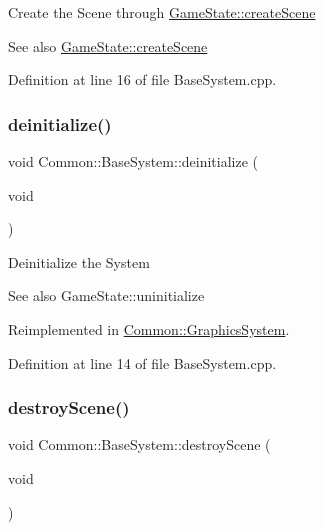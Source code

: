 Create the Scene through \hyperlink{class_common_1_1_game_state_a30b77d03dd849ebb2d6698686e9e7619}{Game\+State\+::create\+Scene} \begin{DoxySeeAlso}{See also}
\hyperlink{class_common_1_1_game_state_a30b77d03dd849ebb2d6698686e9e7619}{Game\+State\+::create\+Scene} 
\end{DoxySeeAlso}


Definition at line 16 of file Base\+System.\+cpp.

\mbox{\label{class_common_1_1_base_system_a081f0d3daaff552efe736e6096d329e9}} 
\subsubsection{\texorpdfstring{deinitialize()}{deinitialize()}}
{\footnotesize\ttfamily void Common\+::\+Base\+System\+::deinitialize (\begin{DoxyParamCaption}\item[{void}]{ }\end{DoxyParamCaption})\hspace{0.3cm}{\ttfamily [virtual]}}

Deinitialize the System \begin{DoxySeeAlso}{See also}
Game\+State\+::uninitialize 
\end{DoxySeeAlso}


Reimplemented in \hyperlink{class_common_1_1_graphics_system_ade2d4efd6e535d312818a92230eb7dcf}{Common\+::\+Graphics\+System}.



Definition at line 14 of file Base\+System.\+cpp.

\mbox{\label{class_common_1_1_base_system_a04ce870b4d3429942afb58137fd376ca}} 
\subsubsection{\texorpdfstring{destroy\+Scene()}{destroyScene()}}
{\footnotesize\ttfamily void Common\+::\+Base\+System\+::destroy\+Scene (\begin{DoxyParamCaption}\item[{void}]{ }\end{DoxyParamCaption})\hspace{0.3cm}{\ttfamily [virtual]}}

